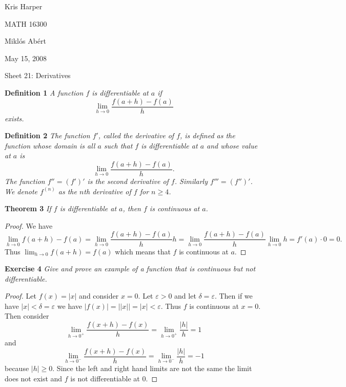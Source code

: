 \documentclass{article}
\begin{document}
\begin{flushright}
Kris Harper

MATH 16300

Mikl\'{o}s Ab\'{e}rt

May 15, 2008
\end{flushright}

\begin{flushleft}

\Large

Sheet 21: Derivatives\newline

\normalsize

\textbf{Definition 1}
\textsl{A function $f$ is differentiable at $a$ if
\[
\lim_{h \rightarrow 0} \frac{f(a+h) - f(a)}{h}
\]
exists.}\newline

\textbf{Definition 2}
\textsl{The function $f'$, called the derivative of $f$, is defined as the function whose domain is all $a$ such that $f$ is differentiable at $a$ and whose value at $a$ is
\[
\lim_{h \rightarrow 0} \frac{f(a+h) - f(a)}{h}.
\]
The function $f'' = (f')'$ is the second derivative of $f$. Similarly $f''' = (f'')'$. We denote $f^{(n)}$ as the $n$th derivative of $f$ for $n \geq 4$.}\newline

\textbf{Theorem 3}
\textsl{If $f$ is differentiable at $a$, then $f$ is continuous at $a$.}
\begin{proof}
We have
\[
\lim_{h \rightarrow 0} f(a+h) - f(a) = \lim_{h \rightarrow 0} \frac{f(a+h) - f(a)}{h} h = \lim_{h \rightarrow 0} \frac{f(a+h) - f(a)}{h} \lim_{h \rightarrow 0} h = f'(a) \cdot 0 = 0.
\]
Thus $\lim_{h \rightarrow 0} f(a + h) = f(a)$ which means that $f$ is continuous at $a$.
\end{proof}

\textbf{Exercise 4}
\textsl{Give and prove an example of a function that is continuous but not differentiable.}
\begin{proof}
Let $f(x) = |x|$ and consider $x = 0$. Let $\varepsilon > 0$ and let $\delta = \varepsilon$. Then if we have $|x| < \delta = \varepsilon$ we have $|f(x)| = ||x|| = |x| < \varepsilon$. Thus $f$ is continuous at $x = 0$. Then consider
\[
\lim_{h \rightarrow 0^+} \frac{f(x+h) - f(x)}{h} = \lim_{h \rightarrow 0^+} \frac{|h|}{h} = 1
\]
and
\[
\lim_{h \rightarrow 0^-} \frac{f(x+h) - f(x)}{h} = \lim_{h \rightarrow 0^-} \frac{|h|}{h} = -1
\]
because $|h| \geq 0$. Since the left and right hand limits are not the same the limit does not exist and $f$ is not differentiable at $0$.
\end{proof}


\end{flushleft}
\end{document}
